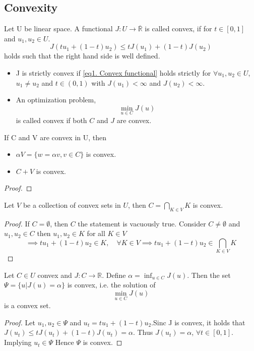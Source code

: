 \subsection{Convexity}
\begin{definition}
	Let U be linear space. A functional $J:U\rightarrow \overline{\mathbb{R}}$ is called convex, if for $t\in[0,1]$ and $u_1, u_2 \in U$.
	\begin{equation*}
		J(tu_1+(1-t)u_2)\leq t J(u_1)+(1-t)J(u_2) \label{eq1. Convex functional}
	\end{equation*}
	holds such that the right hand side is well defined.
	\begin{itemize}
	\item 	J is strictly convex if \eqref{eq1. Convex functional} holds strictly for $\forall u_1, u_2 \in U$, $u_1\neq u_2$ and $t \in (0,1)$ with $J(u_1)<\infty$ and $J(u_2)< \infty$.
	\item An optimization problem, 
	\[
		\min_{u \in C} J(u)
	\] is called convex if both $C$ and $J$ are convex.
	\end{itemize}
\end{definition}

\begin{lemma}
	If C and V are convex in U, then
	\begin{itemize}
		\item  $\alpha V = \lbrace w = \alpha v, v\in C \rbrace$ is convex.
		\item $C+V$ is convex.
	\end{itemize}
	\begin{proof}
		
	\end{proof}
\end{lemma}


\begin{lemma}
	Let $V$ be a collection of convex sets in $U$, then $C=\bigcap_{K \in V} K$ is convex.
	\begin{proof}
			If $C = \emptyset$, then $C$ the statement is vacuously true. Consider $C\neq \emptyset$ and $u_1, u_2 \in C$ then $u_1, u_2 \in K$ for all $K \in V$
			\[
			\implies tu_1+(1-t)u_2 \in K, \quad \forall K \in V \implies tu_1+(1-t)u_2 \in \bigcap_{K \in V} K 
			\]
	\end{proof}
\end{lemma}

\begin{lemma}
		Let $C\in U$ convex and $J: C \rightarrow \mathbb{R}$. Define $\alpha=\inf_{u\in C} J(u)$. Then the set $\Psi = \{u | J(u)=\alpha\}$ is convex, i.e. the solution of 
		\[
			\min_{u \in C} J(u)
		\] 
		is a convex set.
		\begin{proof}
			Let $u_1, u_2 \in \Psi$ and $u_t=tu_1+(1-t)u_2$.Sinc J is convex, it holds that
			$J(u_t)\leq t J(u_t)+(1-t)J(u_t)=\alpha$. Thus $J(u_t)=\alpha$, $\forall t \in [0,1]$. Implying $u_t \in \Psi$ Hence $\Psi$ is convex.
		\end{proof}
\end{lemma}

